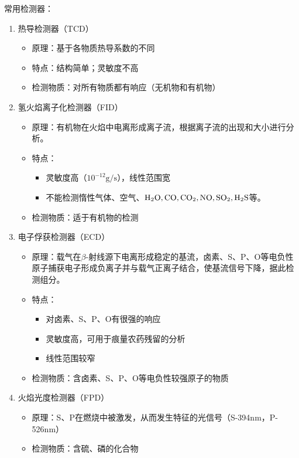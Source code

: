 常用检测器：
\begin{enumerate}
	\item 热导检测器（TCD）
	\begin{itemize}
		\item 原理：基于各物质热导系数的不同
		\item 特点：结构简单；灵敏度不高
		\item 检测物质：对所有物质都有响应（无机物和有机物）
	\end{itemize}
	\item 氢火焰离子化检测器（FID）
	\begin{itemize}
		\item 原理：有机物在火焰中电离形成离子流，根据离子流的出现和大小进行分析。
		\item 特点：
		\begin{itemize}
			\item 灵敏度高（$10^{-12}\mathrm{g/s}$），线性范围宽
			\item 不能检测惰性气体、空气、$\ce{H2O,CO,CO2,NO,SO2,H2S}$等。
		\end{itemize}
		\item 检测物质：适于有机物的检测
	\end{itemize}
	\item 电子俘获检测器（ECD）
	\begin{itemize}
		\item 原理：载气在$\beta$-射线源下电离形成稳定的基流，卤素、S、P、O等电负性原子捕获电子形成负离子并与载气正离子结合，使基流信号下降，据此检测组分。
		\item 特点：
		\begin{itemize}
			\item 对卤素、S、P、O有很强的响应
			\item 灵敏度高，可用于痕量农药残留的分析
			\item 线性范围较窄
		\end{itemize}
		\item 检测物质：含卤素、S、P、O等电负性较强原子的物质
	\end{itemize}
	\item 火焰光度检测器（FPD）
	\begin{itemize}
		\item 原理：S、P在燃烧中被激发，从而发生特征的光信号（S-394nm，P-526nm）	
		\item 检测物质：含硫、磷的化合物
	\end{itemize}
\end{enumerate}

